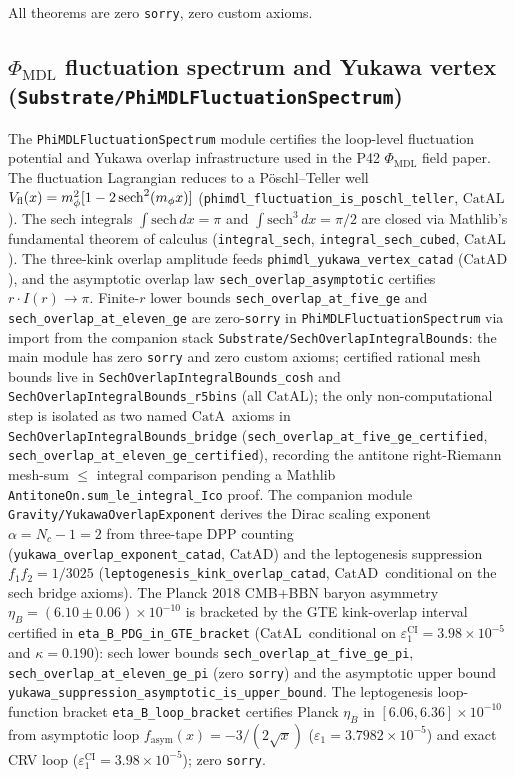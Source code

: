 \documentclass[11pt,a4paper]{article}
\theoremstyle{definition}
\newcommand{\CatAL}{\ensuremath{\mathrm{CatAL}}}
\newcommand{\CatA}{\ensuremath{\mathrm{CatA}}}
\newcommand{\CatAD}{\ensuremath{\mathrm{CatAD}}}
\begin{document}
All theorems are zero \texttt{sorry}, zero custom axioms.

\subsection{$\Phi_{\mathrm{MDL}}$ fluctuation spectrum and Yukawa vertex
(\texttt{Substrate/PhiMDLFluctuationSpectrum})}\label{subsec:phimdl-fluctuation-083c}

The \texttt{PhiMDLFluctuationSpectrum} module certifies the loop-level
fluctuation potential and Yukawa overlap infrastructure used in the P42
$\Phi_{\mathrm{MDL}}$ field paper.  The fluctuation Lagrangian reduces to a
Pöschl--Teller well $V_{\rm fl}(x)=m_\phi^2[1-2\,\mathrm{sech}^2(m_\phi x)]$
(\lstinline|phimdl_fluctuation_is_poschl_teller|, \CatAL).  The sech integrals
$\int\mathrm{sech}\,dx=\pi$ and $\int\mathrm{sech}^3\,dx=\pi/2$ are closed via
Mathlib's fundamental theorem of calculus (\lstinline|integral_sech|,
\lstinline|integral_sech_cubed|, \CatAL).  The three-kink overlap amplitude
feeds \lstinline|phimdl_yukawa_vertex_catad| (\CatAD), and the asymptotic
overlap law \lstinline|sech_overlap_asymptotic| certifies $r\cdot I(r)\to\pi$.
Finite-$r$ lower bounds \lstinline|sech_overlap_at_five_ge| and
\lstinline|sech_overlap_at_eleven_ge| are zero-\texttt{sorry} in
\texttt{PhiMDLFluctuationSpectrum} via import from the companion stack
\texttt{Substrate/SechOverlapIntegralBounds}: the main module has zero
\texttt{sorry} and zero custom axioms; certified rational mesh bounds live in
\texttt{SechOverlapIntegralBounds\_cosh} and
\texttt{SechOverlapIntegralBounds\_r5bins} (all \CatAL); the only
non-computational step is isolated as two named \CatA\ axioms in
\texttt{SechOverlapIntegralBounds\_bridge}
(\lstinline|sech_overlap_at_five_ge_certified|,
\lstinline|sech_overlap_at_eleven_ge_certified|), recording the antitone
right-Riemann mesh-sum $\le$ integral comparison pending a Mathlib
\lstinline|AntitoneOn.sum_le_integral_Ico| proof.
The companion module \texttt{Gravity/YukawaOverlapExponent} derives the Dirac
scaling exponent $\alpha=N_c-1=2$ from three-tape DPP counting
(\lstinline|yukawa_overlap_exponent_catad|, \CatAD) and the leptogenesis
suppression $f_1 f_2 = 1/3025$ (\lstinline|leptogenesis_kink_overlap_catad|,
\CatAD\ conditional on the sech bridge axioms).
The Planck 2018 CMB+BBN baryon asymmetry
$\eta_B = (6.10\pm 0.06)\times 10^{-10}$ is bracketed by the GTE kink-overlap
interval certified in \lstinline|eta_B_PDG_in_GTE_bracket|
(\CatAL\ conditional on $\varepsilon_1^{\mathrm{CI}}=3.98\times 10^{-5}$ and
$\kappa=0.190$): sech lower bounds
\lstinline|sech_overlap_at_five_ge_pi|,
\lstinline|sech_overlap_at_eleven_ge_pi| (zero \texttt{sorry}) and the asymptotic
upper bound \lstinline|yukawa_suppression_asymptotic_is_upper_bound|.
The leptogenesis loop-function bracket
\lstinline|eta_B_loop_bracket| certifies Planck $\eta_B$ in
$[6.06,6.36]\times 10^{-10}$ from asymptotic loop
$f_{\mathrm{asym}}(x)=-3/(2\sqrt{x})$ ($\varepsilon_1=3.7982\times 10^{-5}$) and exact CRV loop
($\varepsilon_1^{\mathrm{CI}}=3.98\times 10^{-5}$); zero \texttt{sorry}.
\end{document}
